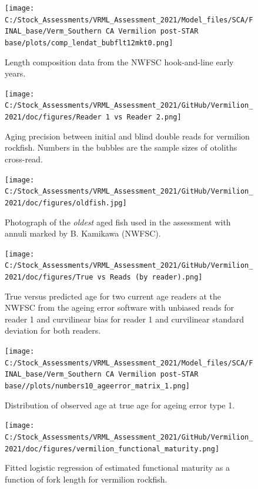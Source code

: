 \documentclass[11pt,
  english,
]{article}
\begin{document}
\begin{figure}
\centering
\texttt{[image: C:/Stock\_Assessments/VRML\_Assessment\_2021/Model\_files/SCA/FINAL\_base/Verm\_Southern CA Vermilion post-STAR base/plots/comp\_lendat\_bubflt12mkt0.png]}
\caption{Length composition data from the NWFSC hook-and-line early years.\label{fig:len-data-EARLY-HKL}}
\end{figure}

\begin{figure}
\centering
\texttt{[image: C:/Stock\_Assessments/VRML\_Assessment\_2021/GitHub/Vermilion\_2021/doc/figures/Reader 1 vs Reader 2.png]}
\caption{Aging precision between initial and blind double reads for vermilion rockfish. Numbers in the bubbles are the sample sizes of otoliths cross-read.\label{fig:reader1reader2}}
\end{figure}

\begin{figure}
\centering
\texttt{[image: C:/Stock\_Assessments/VRML\_Assessment\_2021/GitHub/Vermilion\_2021/doc/figures/oldfish.jpg]}
\caption{Photograph of the \emph{oldest} aged fish used in the assessment with annuli marked by B. Kamikawa (NWFSC).\label{fig:oldfish}}
\end{figure}

\begin{figure}
\centering
\texttt{[image: C:/Stock\_Assessments/VRML\_Assessment\_2021/GitHub/Vermilion\_2021/doc/figures/True vs Reads (by reader).png]}
\caption{True versus predicted age for two current age readers at the NWFSC from the ageing error software with unbiased reads for reader 1 and curvilinear bias for reader 1 and curvilinear standard deviation for both readers.\label{fig:truereads}}
\end{figure}

\begin{figure}
\centering
\texttt{[image: C:/Stock\_Assessments/VRML\_Assessment\_2021/Model\_files/SCA/FINAL\_base/Verm\_Southern CA Vermilion post-STAR base//plots/numbers10\_ageerror\_matrix\_1.png]}
\caption{Distribution of observed age at true age for ageing error type 1.\label{fig:ageerror}}
\end{figure}

\begin{figure}
\centering
\texttt{[image: C:/Stock\_Assessments/VRML\_Assessment\_2021/GitHub/Vermilion\_2021/doc/figures/vermilion\_functional\_maturity.png]}
\caption{Fitted logistic regression of estimated functional maturity as a function of fork length for vermilion rockfish.\label{fig:functional-maturity}}
\end{figure}
\end{document}
